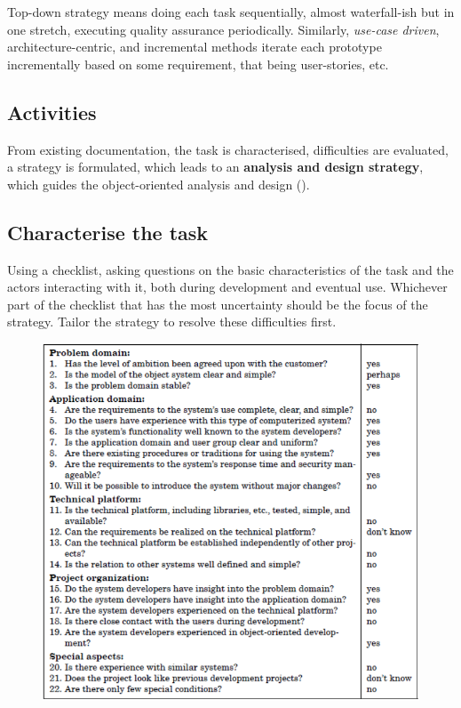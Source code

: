 Top-down strategy means doing each task sequentially, almost waterfall-ish but in one stretch, executing quality assurance periodically. Similarly, \textit{use-case driven}, architecture-centric, and incremental methods iterate each prototype incrementally based on some requirement, that being user-stories, etc.

\subsection{Activities}
From existing documentation, the task is characterised, difficulties are evaluated, a strategy is formulated, which leads to an \textbf{analysis and design strategy}, which guides the object-oriented analysis and design (\ad).

\subsection{Characterise the task}
Using a checklist, asking questions on the basic characteristics of the task and the actors interacting with it, both during development and eventual use. Whichever part of the checklist that has the most uncertainty should be the focus of the strategy. Tailor the strategy to resolve these difficulties first. 

\begin{figure}[H]
    \centering
    \includegraphics[width=.7\textwidth]{figures/checklist.png}
\end{figure}

